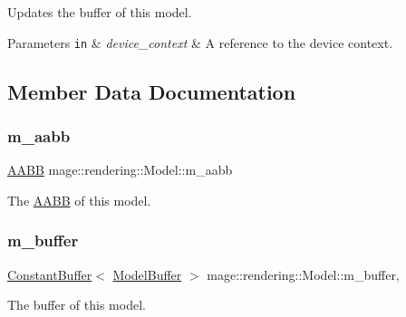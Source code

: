 Updates the buffer of this model.


\begin{DoxyParams}[1]{Parameters}
\mbox{\tt in}  & {\em device\+\_\+context} & A reference to the device context. \\
\hline
\end{DoxyParams}


\subsection{Member Data Documentation}
\hypertarget{classmage_1_1rendering_1_1_model_a7b3bb86ad718ba3dae2b1c6042fdeaec}{}\label{classmage_1_1rendering_1_1_model_a7b3bb86ad718ba3dae2b1c6042fdeaec} 
\subsubsection{\texorpdfstring{m\+\_\+aabb}{m\_aabb}}
{\footnotesize\ttfamily \hyperlink{classmage_1_1_a_a_b_b}{A\+A\+BB} mage\+::rendering\+::\+Model\+::m\+\_\+aabb\hspace{0.3cm}{\ttfamily [private]}}

The \hyperlink{classmage_1_1_a_a_b_b}{A\+A\+BB} of this model. \hypertarget{classmage_1_1rendering_1_1_model_a82132035b4631143bed489c4bc190f95}{}\label{classmage_1_1rendering_1_1_model_a82132035b4631143bed489c4bc190f95} 
\subsubsection{\texorpdfstring{m\+\_\+buffer}{m\_buffer}}
{\footnotesize\ttfamily \hyperlink{classmage_1_1rendering_1_1_constant_buffer}{Constant\+Buffer}$<$ \hyperlink{structmage_1_1rendering_1_1_model_buffer}{Model\+Buffer} $>$ mage\+::rendering\+::\+Model\+::m\+\_\+buffer\hspace{0.3cm}{\ttfamily [mutable]}, {\ttfamily [private]}}

The buffer of this model. \hypertarget{classmage_1_1rendering_1_1_model_a796fd0c51ea194826dde990b10e70856}{}\label{classmage_1_1rendering_1_1_model_a796fd0c51ea194826dde990b10e70856} 
